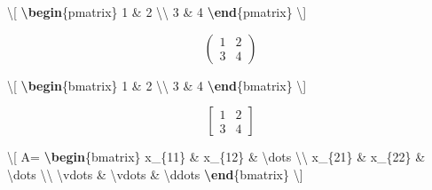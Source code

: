 \documentclass[
  10pt,
]{scrbook}
\newenvironment{Shaded}{\begin{snugshade}}{\end{snugshade}}
\newcommand{\ExtensionTok}[1]{#1}
\newcommand{\KeywordTok}[1]{\textcolor[rgb]{0.13,0.29,0.53}{\textbf{#1}}}
\newcommand{\NormalTok}[1]{#1}
\newcommand{\SpecialCharTok}[1]{\textcolor[rgb]{0.00,0.00,0.00}{#1}}
\newcommand{\SpecialStringTok}[1]{\textcolor[rgb]{0.31,0.60,0.02}{#1}}
\theoremstyle{definition}
\theoremstyle{definition}
\theoremstyle{definition}
\theoremstyle{definition}
\theoremstyle{remark}
\begin{document}
\begin{Shaded}
\begin{Highlighting}[]
\SpecialStringTok{\textbackslash{}[}
\KeywordTok{\textbackslash{}begin}\NormalTok{\{}\ExtensionTok{pmatrix}\NormalTok{\}}
\SpecialStringTok{1 \& 2 }\SpecialCharTok{\textbackslash{}\textbackslash{}}
\SpecialStringTok{3 \& 4}
\KeywordTok{\textbackslash{}end}\NormalTok{\{}\ExtensionTok{pmatrix}\NormalTok{\}}
\SpecialStringTok{\textbackslash{}]}
\end{Highlighting}
\end{Shaded}

\[
\begin{pmatrix}
1 & 2 \\
3 & 4
\end{pmatrix}
\]

\begin{Shaded}
\begin{Highlighting}[]
\SpecialStringTok{\textbackslash{}[}
\KeywordTok{\textbackslash{}begin}\NormalTok{\{}\ExtensionTok{bmatrix}\NormalTok{\}}
\SpecialStringTok{1 \& 2 }\SpecialCharTok{\textbackslash{}\textbackslash{}}
\SpecialStringTok{3 \& 4}
\KeywordTok{\textbackslash{}end}\NormalTok{\{}\ExtensionTok{bmatrix}\NormalTok{\}}
\SpecialStringTok{\textbackslash{}]}
\end{Highlighting}
\end{Shaded}

\[
\begin{bmatrix}
1 & 2 \\
3 & 4
\end{bmatrix}
\]

\begin{Shaded}
\begin{Highlighting}[]
\SpecialStringTok{\textbackslash{}[}
\SpecialStringTok{A=}
\KeywordTok{\textbackslash{}begin}\NormalTok{\{}\ExtensionTok{bmatrix}\NormalTok{\}}
\SpecialStringTok{x\_\{11\} \& x\_\{12\} \& }\SpecialCharTok{\textbackslash{}dots}\SpecialStringTok{ }\SpecialCharTok{\textbackslash{}\textbackslash{}}
\SpecialStringTok{x\_\{21\} \& x\_\{22\} \& }\SpecialCharTok{\textbackslash{}dots}\SpecialStringTok{ }\SpecialCharTok{\textbackslash{}\textbackslash{}}
\SpecialCharTok{\textbackslash{}vdots}\SpecialStringTok{ \& }\SpecialCharTok{\textbackslash{}vdots}\SpecialStringTok{ \& }\SpecialCharTok{\textbackslash{}ddots}
\KeywordTok{\textbackslash{}end}\NormalTok{\{}\ExtensionTok{bmatrix}\NormalTok{\}}
\SpecialStringTok{\textbackslash{}]}
\end{Highlighting}
\end{Shaded}
\end{document}
